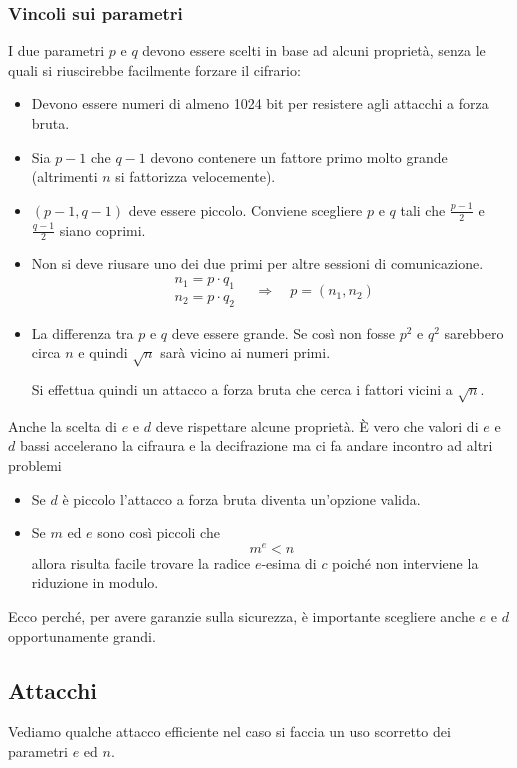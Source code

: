 \subsubsection{Vincoli sui parametri}
I due parametri $p$ e $q$ devono essere scelti in base ad alcuni propriet\`a, senza le quali si riuscirebbe
facilmente forzare il cifrario:
\begin{itemize}
	\item Devono essere numeri di almeno 1024 bit per resistere agli attacchi a forza bruta.
	\item Sia $p-1$ che $q-1$ devono contenere un fattore primo molto grande (altrimenti $n$ si fattorizza
	      velocemente).
	\item $(p-1, q-1)$ deve essere piccolo. Conviene scegliere $p$ e $q$ tali che $\frac{p-1}{2}$ e $\frac{q-1}{2}$
	      siano coprimi.
	\item Non si deve riusare uno dei due primi per altre sessioni di comunicazione.
	      \[
		      \begin{matrix}
			      n_1 = p \cdot q_1 \\
			      n_2 = p \cdot q_2
		      \end{matrix}
		      \quad \Rightarrow \quad
		      p = (n_1, n_2)
	      \]
	\item La differenza tra $p$ e $q$ deve essere grande. Se cos\`i non fosse $p^2$ e $q^2$ sarebbero circa $n$ e
	      quindi $\sqrt{n}$ sar\`a vicino ai numeri primi.

	      Si effettua quindi un attacco a forza bruta che cerca i fattori vicini a $\sqrt{n}$.
\end{itemize}

Anche la scelta di $e$ e $d$ deve rispettare alcune propriet\`a. \`E vero che valori di $e$ e $d$ bassi accelerano
la cifraura e la decifrazione ma ci fa andare incontro ad altri problemi
\begin{itemize}
	\item Se $d$ \`e piccolo l'attacco a forza bruta diventa un'opzione valida.
	\item Se $m$ ed $e$ sono cos\`i piccoli che
	      \[ m^e < n \]
	      allora risulta facile trovare la radice $e$-esima di $c$ poich\'e non interviene la riduzione in modulo.
\end{itemize}
Ecco perch\'e, per avere garanzie sulla sicurezza, \`e importante scegliere anche $e$ e $d$ opportunamente grandi.

\subsection{Attacchi}
Vediamo qualche attacco efficiente nel caso si faccia un uso scorretto dei parametri $e$ ed $n$.

